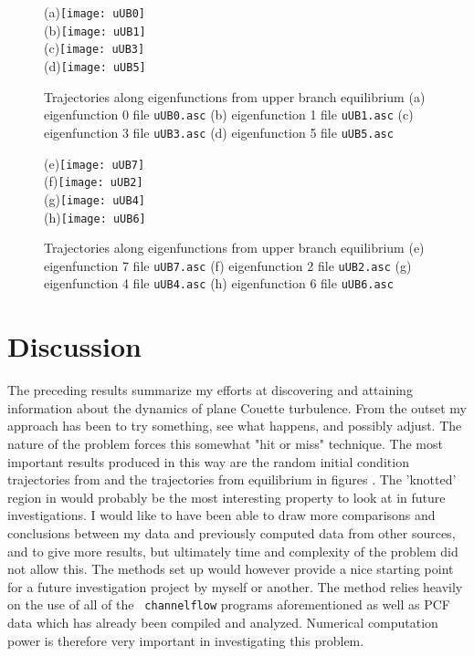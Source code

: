 \documentclass[pre,twocolumn,groupedaddress]{revtex4}
\begin{document}
{%
\begin{figure}[htbp]
  (a)\texttt{[image: uUB0]}\\
  (b)\texttt{[image: uUB1]}\\
  (c)\texttt{[image: uUB3]}\\
  (d)\texttt{[image: uUB5]}\\
 \caption{Trajectories along eigenfunctions from upper branch
  equilibrium
    (a) eigenfunction 0 file {\tt uUB0.asc}
    (b) eigenfunction 1 file {\tt uUB1.asc}
    (c) eigenfunction 3 file {\tt uUB3.asc}
    (d) eigenfunction 5 file {\tt uUB5.asc}
} \label{eltonFig:UBefs1/new}
\end{figure}

\begin{figure}[htbp]
  (e)\texttt{[image: uUB7]}\\
  (f)\texttt{[image: uUB2]}\\
  (g)\texttt{[image: uUB4]}\\
  (h)\texttt{[image: uUB6]}\\
  \caption{
  Trajectories along eigenfunctions from upper branch equilibrium
    (e) eigenfunction 7 file {\tt uUB7.asc}
    (f) eigenfunction 2 file {\tt uUB2.asc}
    (g) eigenfunction 4 file {\tt uUB4.asc}
    (h) eigenfunction 6 file {\tt uUB6.asc}
          }
  \label{eltonFig:UBefs2/new}
\end{figure}

\newpage
\newpage
\newpage
\newpage


\section{Discussion}
\label{sec:sum}

The preceding results summarize my efforts at discovering and
attaining information about the dynamics of plane Couette
turbulence. From the outset my approach has been to try something,
see what happens, and possibly adjust. The nature of the problem
forces this somewhat "hit or miss" technique. The most important
results produced in this way are the random initial condition
trajectories from  and the trajectories
from equilibrium in figures
. The 'knotted'
region in  would probably be the most
interesting property to look at in future investigations. I would
like to have been able to draw more comparisons and conclusions
between my data and previously computed data from other sources, and
to give more results, but ultimately time and complexity of the
problem did not allow this. The methods set up would however provide
a nice starting point for a future investigation project by myself
or another. The method relies heavily on the use of all of the {\tt
channelflow} programs aforementioned as well as PCF data which has
already been compiled and analyzed. Numerical computation power is
therefore very important in investigating this problem.




}
\end{document}
